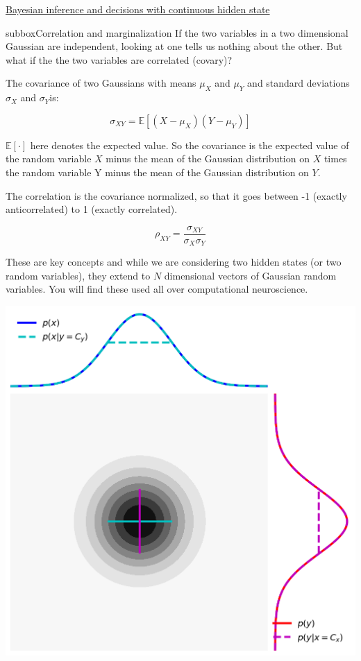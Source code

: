 \begin{textbox}{\href{https://compneuro.neuromatch.io/tutorials/W3D1_BayesianDecisions/student/W3D1_Tutorial2.html}{Bayesian inference and decisions with continuous hidden state } }
\begin{subbox}{subbox}{Correlation and marginalization}
If the two variables in a two dimensional Gaussian are independent, looking at one tells us nothing about the other. But what if the the two variables are correlated (covary)?

The covariance of two Gaussians with means $\mu_X$ and $\mu_Y$ and standard deviations $\sigma_X$ and $\sigma_Y$is:

\begin{equation}
\sigma_{XY} = \mathbb{E}[(X-\mu_{X})(Y-\mu_{Y})]
\end{equation}

$\mathbb{E}[\cdot]$ here denotes the expected value. So the covariance is the expected value of the random variable $X$ minus the mean of the Gaussian distribution on $X$ times the random variable Y minus the mean of the Gaussian distribution on $Y$.

The correlation is the covariance normalized, so that it goes between -1 (exactly anticorrelated) to 1 (exactly correlated).

\begin{equation}
\rho_{XY} = \frac{\sigma_{XY}}{\sigma_{X}\sigma_{Y}}
\end{equation}

These are key concepts and while we are considering two hidden states (or two random variables), they extend to $N$ dimensional vectors of Gaussian random variables. You will find these used all over computational neuroscience.
\begin{center}
    
\includegraphics[scale=0.18]{Figures/BD/BD_Figure10.png}
\end{center}

\end{subbox}
\end{textbox}
